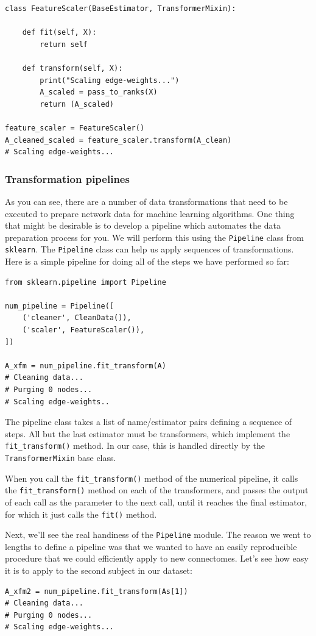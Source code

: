 \begin{lstlisting}[style=python]
class FeatureScaler(BaseEstimator, TransformerMixin):
    
    def fit(self, X):
        return self
    
    def transform(self, X):
        print("Scaling edge-weights...")
        A_scaled = pass_to_ranks(X)
        return (A_scaled)
    
feature_scaler = FeatureScaler()
A_cleaned_scaled = feature_scaler.transform(A_clean)
# Scaling edge-weights...
\end{lstlisting}

\subsubsection{Transformation pipelines}

As you can see, there are a number of data transformations that need to be executed to prepare network data for machine learning algorithms. One thing that might be desirable is to develop a pipeline which automates the data preparation process for you. We will perform this using the \texttt{Pipeline} class from \texttt{sklearn}. The \texttt{Pipeline} class can help us apply sequences of transformations. Here is a simple pipeline for doing all of the steps we have performed so far:
\begin{lstlisting}[style=python]
from sklearn.pipeline import Pipeline

num_pipeline = Pipeline([
    ('cleaner', CleanData()),
    ('scaler', FeatureScaler()),
])

A_xfm = num_pipeline.fit_transform(A)
# Cleaning data...
# Purging 0 nodes...
# Scaling edge-weights..
\end{lstlisting}

The pipeline class takes a list of name/estimator pairs defining a sequence of steps. All but the last estimator must be transformers, which implement the \texttt{fit\_transform()} method. In our case, this is handled directly by the \texttt{TransformerMixin} base class.

When you call the \texttt{fit\_transform()} method of the numerical pipeline, it calls the \texttt{fit\_transform()} method on each of the transformers, and passes the output of each call as the parameter to the next call, until it reaches the final estimator, for which it just calls the \texttt{fit()} method. 

Next, we'll see the real handiness of the \texttt{Pipeline} module. The reason we went to lengths to define a pipeline was that we wanted to have an easily reproducible procedure that we could efficiently apply to new connectomes. Let's see how easy it is to apply to the second subject in our dataset:

\begin{lstlisting}[style=python]
A_xfm2 = num_pipeline.fit_transform(As[1])
# Cleaning data...
# Purging 0 nodes...
# Scaling edge-weights...
\end{lstlisting}

\newpage